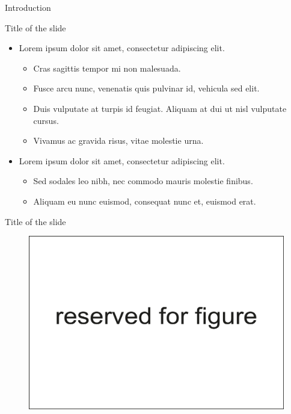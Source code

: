 \documentclass[russian,12pt,aspectratio=169,xcolor=table]{beamer}
\begin{document}
\begin{frame}{Introduction}
\begin{itemize}
  \end{itemize}
\end{frame}

\begin{frame}{Title of the slide}
  \begin{itemize}\itemsep6pt
    \item Lorem ipsum dolor sit amet, consectetur adipiscing elit.
    \begin{itemize}\itemsep6pt
      \item Cras sagittis tempor mi non malesuada.
      \item Fusce arcu nunc, venenatis quis pulvinar id, vehicula sed elit.
      \item Duis vulputate at turpis id feugiat. Aliquam at dui ut nisl vulputate cursus. 
      \item Vivamus ac gravida risus, vitae molestie urna.
    \end{itemize}
    
    \item Lorem ipsum dolor sit amet, consectetur adipiscing elit.
      \begin{itemize}\itemsep6pt
        \item Sed sodales leo nibh, nec commodo mauris molestie finibus.
        \item Aliquam eu nunc euismod, consequat nunc et, euismod erat. 
      \end{itemize}
    \end{itemize}
\end{frame}

\begin{frame}{Title of the slide}
  \begin{figure}
    \centering
    \includegraphics[scale=0.5]{img/2}
  \end{figure}
\end{frame}
\end{document}
